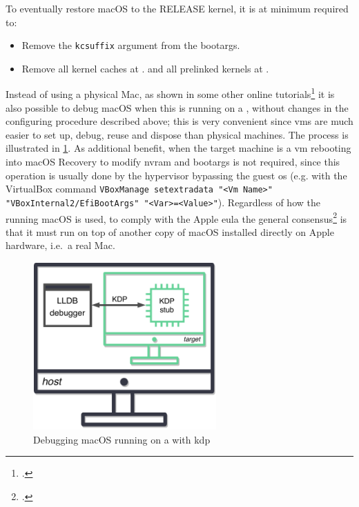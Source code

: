 To eventually restore macOS to the RELEASE kernel, it is at minimum required to:
\begin{itemize}
\item Remove the \lstinline{kcsuffix} argument from the \glspl{bootarg}.
\item Remove all kernel caches at . and all prelinked kernels at .
\end{itemize}

Instead of using a physical Mac, as shown in some other online tutorials\footcites{MacOSDebug6,MacOSDebug7,MacOSDebug8,MacOSDebug10} it is also possible to debug macOS when this is running on a , without changes in the configuring procedure described above; this is very convenient since \glspl{vm} are much easier to set up, debug, reuse and dispose than physical machines. The process is illustrated in \cref{fig:vmdbg}. As additional benefit, when the target machine is a \gls{vm} rebooting into macOS Recovery to modify \gls{nvram} and \glspl{bootarg} is not required, since this operation is usually done by the hypervisor bypassing the guest \gls{os} (e.g. with the VirtualBox command \lstinline{VBoxManage setextradata "<Vm Name>" "VBoxInternal2/EfiBootArgs" "<Var>=<Value>"}). Regardless of how the  running macOS is used, to comply with the Apple \gls{eula} the general consensus\footcite{CommunityForums1} is that it must run on top of another copy of macOS installed directly on Apple hardware, i.e.\ a real Mac.

\begin{figure}
    \centering
    \caption{Debugging macOS running on a  with \gls{kdp}}\label{fig:vmdbg}
    \includegraphics[width=70mm]{figures/debugging-vm-debugging.pdf}
\end{figure}


